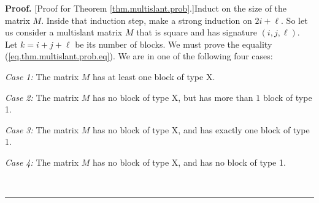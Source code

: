 \documentclass[numbers=enddot,12pt,final,onecolumn,notitlepage]{scrartcl}%
\theoremstyle{definition}
\newenvironment{proof}[1][Proof]{\noindent\textbf{#1.} }{\ \rule{0.5em}{0.5em}}
\theoremstyle{plainsl}
\begin{document}
\begin{proof}
[Proof for Theorem \ref{thm.multislant.prob}.]Induct on the size of the
matrix $M$. Inside that induction step, make a strong induction on $2i+\ell$.
So let us consider a multislant matrix $M$ that is square and has signature
$\left(  i,j,\ell\right)  $. Let $k=i+j+\ell$ be its number of blocks. We must
prove the equality (\ref{eq.thm.multislant.prob.eq}). We are in one of the
following four cases:

\textit{Case 1:} The matrix $M$ has at least one block of type X.

\textit{Case 2:} The matrix $M$ has no block of type X, but has more than $1$
block of type 1.

\textit{Case 3:} The matrix $M$ has no block of type X, and has exactly one
block of type 1.

\textit{Case 4:} The matrix $M$ has no block of type X, and has no block of
type 1.


\end{proof}
\end{document}
